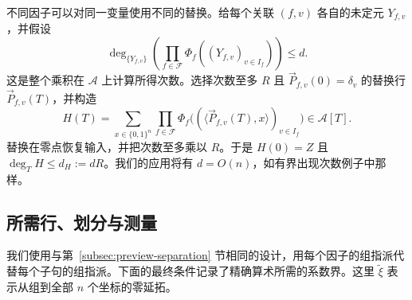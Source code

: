 \documentclass[11pt,reqno]{amsart}
\numberwithin{equation}{section}
\theoremstyle{definition}\newtheorem{definition}[theorem]{定义}
\theoremstyle{remark}\newtheorem{remark}[theorem]{注}
\renewcommand{\le}{\leqslant}
\begin{document}
不同因子可以对同一变量使用不同的替换。给每个关联 $(f,v)$ 各自的未定元 $Y_{f,v}$，并假设
\begin{equation}\label{eq:general-product-degree}
 \deg_{\{Y_{f,v}\}}\!
    \left(\prod_{f\in\mathcal F}\Phi_f((Y_{f,v})_{v\in I_f})\right)\le d .
\end{equation}
这是整个乘积在 $\mathcal A$ 上计算所得次数。选择次数至多 $R$ 且 $\vec P_{f,v}(0)=\delta_v$ 的替换行 $\vec P_{f,v}(T)$，并构造
\begin{equation}\label{eq:general-count-polynomial}
 H(T)=\sum_{x\in\{0,1\}^n}\prod_{f\in\mathcal F}
   \Phi_f\bigl((\langle\vec P_{f,v}(T),x\rangle)_{v\in I_f}\bigr)
   \in\mathcal A[T].
\end{equation}
替换在零点恢复输入，并把次数至多乘以 $R$。于是 $H(0)=Z$ 且 $\deg_T H\le d_H:=dR$。我们的应用将有 $d=O(n)$，如有界出现次数例子中那样。

\subsection{所需行、划分与测量}
\label{subsec:layout-interface}
我们使用与第~\ref{subsec:preview-separation} 节相同的设计，用每个因子的组指派代替每个子句的组指派。下面的最终条件记录了精确算术所需的系数界。这里 $\widetilde\xi$ 表示从组到全部 $n$ 个坐标的零延拓。
\end{document}
